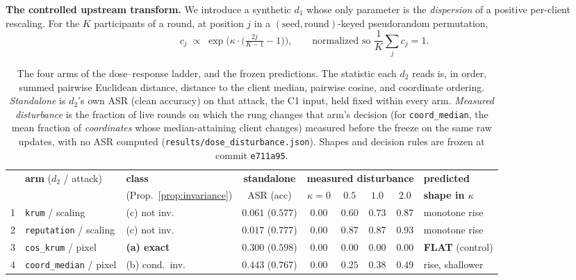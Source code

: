 \documentclass{article}
\begin{document}
\textbf{The controlled upstream transform.} We introduce a synthetic $d_1$ whose only parameter is the \emph{dispersion} of a positive per-client rescaling. For the $K$ participants of a round, at position $j$ in a $(\text{seed},\text{round})$-keyed pseudorandom permutation,
\begin{equation}
c_j \;\propto\; \exp\!\Big(\kappa \cdot \Big(\tfrac{2j}{K-1} - 1\Big)\Big), \qquad \text{normalized so } \textstyle\frac{1}{K}\sum_j c_j = 1 .
\label{eq:dose}
\end{equation}\begin{table}[h]
\caption{The four arms of the dose--response ladder, and the frozen predictions. The statistic each $d_2$ reads is, in order, summed pairwise Euclidean distance, distance to the client median, pairwise cosine, and coordinate ordering. \emph{Standalone} is $d_2$'s own ASR (clean accuracy) on that attack, the C1 input, held fixed within every arm. \emph{Measured disturbance} is the fraction of live rounds on which the rung changes that arm's decision (for \texttt{coord\_median}, the mean fraction of \emph{coordinates} whose median-attaining client changes) measured before the freeze on the same raw updates, with no ASR computed (\texttt{results/dose\_disturbance.json}). Shapes and decision rules are frozen at commit \texttt{e711a95}.}
\label{tab:dose_design}
\centering\footnotesize
\begin{tabular}{cllcccccl}
\toprule
& \textbf{arm} ($d_2$ / attack) & \textbf{class} & \textbf{standalone} & \multicolumn{4}{c}{\textbf{measured disturbance}} & \textbf{predicted} \\
& & (Prop.~\ref{prop:invariance}) & ASR (acc) & $\kappa{=}0$ & $0.5$ & $1.0$ & $2.0$ & \textbf{shape in $\kappa$} \\
\midrule
1 & \texttt{krum} / scaling & (c) not inv. & $0.061$ ($0.577$) & $0.00$ & $0.60$ & $0.73$ & $\mathbf{0.87}$ & monotone rise \\
2 & \texttt{reputation} / scaling & (c) not inv. & $0.017$ ($0.777$) & $0.00$ & $0.87$ & $0.87$ & $\mathbf{0.93}$ & monotone rise \\
3 & \texttt{cos\_krum} / pixel & \textbf{(a) exact} & $0.300$ ($0.598$) & $\mathbf{0.00}$ & $\mathbf{0.00}$ & $\mathbf{0.00}$ & $\mathbf{0.00}$ & \textbf{FLAT} (control) \\
4 & \texttt{coord\_median} / pixel & (b) cond.\ inv. & $0.443$ ($0.767$) & $0.00$ & $0.25$ & $0.38$ & $\mathbf{0.49}$ & rise, shallower \\
\bottomrule
\end{tabular}
\end{table}
\end{document}
